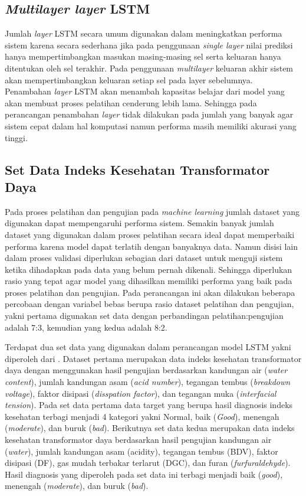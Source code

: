 \subsection{\textit{Multilayer layer} LSTM}
Jumlah \textit{layer} LSTM secara umum digunakan dalam meningkatkan performa sistem karena secara sederhana jika pada penggunaan \textit{single layer} nilai prediksi hanya mempertimbangkan masukan masing-masing sel serta keluaran hanya ditentukan oleh sel terakhir. Pada penggunaan \textit{multilayer} keluaran akhir sistem akan mempertimbangkan keluaran setiap sel pada layer sebelumnya. Penambahan \textit{layer} LSTM akan menambah kapasitas belajar dari model yang akan membuat proses pelatihan cenderung lebih lama. Sehingga pada perancangan penambahan \textit{layer} tidak dilakukan pada jumlah yang banyak agar sistem cepat dalam hal komputasi namun performa masih memiliki akurasi yang tinggi. 

\subsection{Set Data Indeks Kesehatan Transformator Daya}
Pada proses pelatihan dan pengujian pada \textit{machine learning} jumlah dataset yang digunakan dapat mempengaruhi performa sistem. Semakin banyak jumlah dataset yang digunakan dalam proses pelatihan secara ideal dapat memperbaiki performa karena model dapat terlatih dengan banyaknya data. Namun disisi lain dalam proses validasi diperlukan sebagian dari dataset untuk menguji sistem ketika dihadapkan pada data yang belum pernah dikenali. Sehingga diperlukan rasio yang tepat agar model yang dihasilkan memiliki performa yang baik pada proses pelatihan dan pengujian. Pada perancangan ini akan dilakukan beberapa percobaan dengan variabel bebas berupa rasio dataset pelatihan dan pengujian, yakni pertama digunakan set data dengan perbandingan pelatihan:pengujian adalah 7:3, kemudian yang kedua adalah 8:2. 

Terdapat dua set data yang digunakan dalam perancangan model LSTM yakni diperoleh dari \cite{abdillah2020prognostics, shah2016predict, abu2012calculation}. Dataset pertama merupakan data indeks kesehatan transformator daya dengan menggunakan hasil pengujian berdasarkan kandungan air (\textit{water content}), jumlah kandungan asam (\textit{acid number}), tegangan tembus (\textit{breakdown voltage}), faktor disipasi (\textit{disspation factor}), dan tegangan muka (\textit{interfacial tension}). Pada set data pertama data target yang berupa hasil diagnosis indeks kesehatan terbagi menjadi 4 kategori yakni Normal, baik (\textit{Good}), menengah (\textit{moderate}), dan buruk (\textit{bad}).
Berikutnya set data kedua merupakan data indeks kesehatan transformator daya berdasarkan hasil pengujian kandungan air (\textit{water}), jumlah kandungan asam (acidity), tegangan tembus (BDV), faktor disipasi (DF), gas mudah terbakar terlarut (DGC), dan furan (\textit{furfuraldehyde}). Hasil diagnosis yang diperoleh pada set data ini terbagi menjadi baik (\textit{good}), menengah (\textit{moderate}), dan buruk (\textit{bad}).

